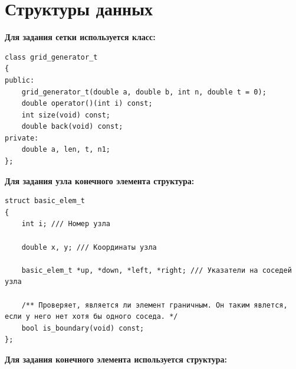 \section{Структуры данных}

\noindent\textbf{Для задания сетки используется класс:}

\begin{tcolorbox}[
	colback=white,
	colframe=black!30!white,
	boxrule=0.5pt, 
	listing only,
	left=-0.5mm,
	leftrule=4mm,
	arc=2mm, outer arc=2mm,
	top=0pt,
	bottom=0pt,
	enhanced jigsaw,
	coltitle=black, 
	fonttitle=\bfseries\ttfamily,
	break at=-\baselineskip/0pt/\textheight, 
]
\begin{verbatim}
class grid_generator_t
{
public:
	grid_generator_t(double a, double b, int n, double t = 0);
	double operator()(int i) const;
	int size(void) const;
	double back(void) const;
private:
	double a, len, t, n1;
};
\end{verbatim}
\end{tcolorbox} 

\noindent\textbf{Для задания узла конечного элемента структура:}

\begin{tcolorbox}[
	colback=white,
	colframe=black!30!white,
	boxrule=0.5pt, 
	listing only,
	left=-0.5mm,
	leftrule=4mm,
	arc=2mm, outer arc=2mm,
	top=0pt,
	bottom=0pt,
	enhanced jigsaw,
	coltitle=black, 
	fonttitle=\bfseries\ttfamily,
	break at=-\baselineskip/0pt/\textheight, 
]
\begin{verbatim}
struct basic_elem_t
{
	int i; /// Номер узла

	double x, y; /// Координаты узла

	basic_elem_t *up, *down, *left, *right; /// Указатели на соседей узла

	/** Проверяет, является ли элемент граничным. Он таким явлется, если у него нет хотя бы одного соседа. */
	bool is_boundary(void) const;
};
\end{verbatim}
\end{tcolorbox} 

\noindent\textbf{Для задания конечного элемента используется структура:}

